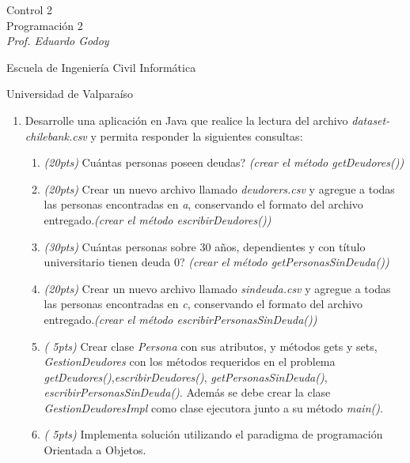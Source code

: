 \documentclass{article}
\begin{document}
\begin{center}
	{\Large Control 2}\\
	Programaci\'on 2 \\
	\emph{\small Prof. Eduardo Godoy} \\
\end{center}
	\centerline{\sc \normalsize Escuela de Ingenier\'ia Civil Inform\'atica}
	\centerline{\sc \normalsize  Universidad de Valpara\'iso}

	\vspace{1pc}

	\begin{enumerate}
	    \item[] Desarrolle una aplicaci\'on en Java que realice la lectura del archivo \emph{dataset-chilebank.csv} y permita responder la siguientes consultas:
	    \begin{enumerate}
	        \item \emph{(20pts)} \textquestiondown Cu\'antas personas poseen deudas? \emph{(crear el m\'etodo getDeudores())}
					\item \emph{(20pts)} Crear un nuevo archivo llamado \emph{deudorers.csv} y agregue a todas las personas encontradas en \emph{a}, conservando el formato del archivo entregado.\emph{(crear el m\'etodo escribirDeudores())}
          \item \emph{(30pts)} \textquestiondown Cu\'antas personas  sobre 30 a\~nos, dependientes y con t\'itulo universitario tienen deuda 0? \emph{(crear el m\'etodo getPersonasSinDeuda())}
	        \item \emph{(20pts)} Crear un nuevo archivo llamado \emph{sindeuda.csv} y agregue a todas las personas encontradas en \emph{c}, conservando el formato del archivo entregado.\emph{(crear el m\'etodo escribirPersonasSinDeuda())}
					\item \emph{( 5pts)} Crear clase \emph{Persona} con  sus atributos,  y m\'etodos gets y sets, \emph{GestionDeudores} con los m\'etodos requeridos en el problema \emph{getDeudores()},\emph{escribirDeudores()}, \emph{getPersonasSinDeuda()},
					\emph{escribirPersonasSinDeuda()}. Adem\'as se debe crear la clase \emph{GestionDeudoresImpl} como clase ejecutora junto a su m\'etodo \emph{main()}.
					\item \emph{( 5pts)} Implementa soluci\'on utilizando el paradigma de programaci\'on Orientada a Objetos.
	    \end{enumerate}
	\end{enumerate}
\end{document}
